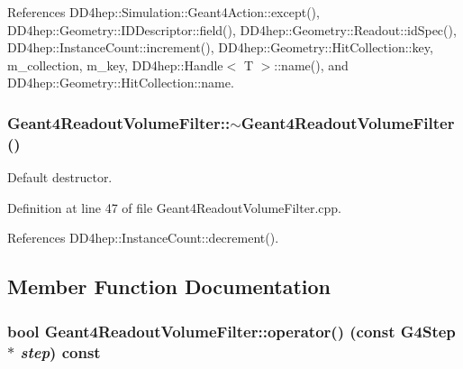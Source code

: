 References DD4hep::Simulation::Geant4Action::except(), DD4hep::Geometry::IDDescriptor::field(), DD4hep::Geometry::Readout::idSpec(), DD4hep::InstanceCount::increment(), DD4hep::Geometry::HitCollection::key, m\_\-collection, m\_\-key, DD4hep::Handle$<$ T $>$::name(), and DD4hep::Geometry::HitCollection::name.\hypertarget{class_d_d4hep_1_1_simulation_1_1_geant4_readout_volume_filter_a36b9e4aa16116e85f3635ac891c60972}{
\subsubsection[{$\sim$Geant4ReadoutVolumeFilter}]{\setlength{\rightskip}{0pt plus 5cm}Geant4ReadoutVolumeFilter::$\sim$Geant4ReadoutVolumeFilter ()}}
\label{class_d_d4hep_1_1_simulation_1_1_geant4_readout_volume_filter_a36b9e4aa16116e85f3635ac891c60972}


Default destructor. 

Definition at line 47 of file Geant4ReadoutVolumeFilter.cpp.

References DD4hep::InstanceCount::decrement().

\subsection{Member Function Documentation}
\hypertarget{class_d_d4hep_1_1_simulation_1_1_geant4_readout_volume_filter_a95a43710204f164feed508114dffb548}{
\subsubsection[{operator()}]{\setlength{\rightskip}{0pt plus 5cm}bool Geant4ReadoutVolumeFilter::operator() (const G4Step $\ast$ {\em step}) const}}
\label{class_d_d4hep_1_1_simulation_1_1_geant4_readout_volume_filter_a95a43710204f164feed508114dffb548}


